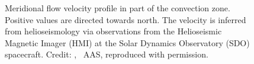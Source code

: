 \begin{figure}[htb]
\begin{floatrow}
{		}{
			\caption[Credit: {\citet[Fig.~4, panel~(a), I moved the colorbox]{Zhao2013}}, \textcopyright~AAS, reproduced with permission.]
			{Meridional flow velocity profile in part of the convection zone. Positive values are directed towards north. The velocity is inferred from helioseismology via observations from the Helioseismic Magnetic Imager (HMI) at the Solar Dynamics Observatory (SDO) spacecraft. Credit: {\citet[Fig.~4, panel~(a), I moved the colorbox]{Zhao2013}}, \textcopyright~AAS, reproduced with permission.}
			\label{fig:Zhao2013_meridional_flow}
		}
	\end{floatrow}
\end{figure}

